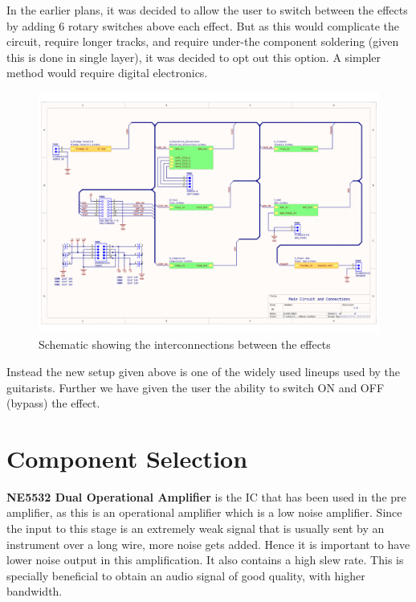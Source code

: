 \documentclass{article}
\begin{document}
                In the earlier plans, it was decided to allow the user to switch between the effects by adding 6 rotary switches above each effect. But as this would complicate the circuit, require longer tracks, and require under-the component soldering (given this is done in single layer), it was decided to opt out this option. A simpler method would require digital electronics.\\

                \begin{figure}
                    \centering
                    \includegraphics[scale=0.4]{conn.png}
                    \caption{Schematic showing the interconnections between the effects}
                    \label{fig:enter-label}
                \end{figure}
                
                Instead the new setup given above is one of the widely used lineups used by the guitarists. Further we have given the user the ability to switch ON and OFF (bypass) the effect.  
                
                
	\section{Component Selection}
            \textbf{NE5532 Dual Operational Amplifier} is the IC that has been used in the pre amplifier, as this is an operational amplifier which is a low noise amplifier. Since the input to this stage is an extremely weak signal that is usually sent by an instrument over a long wire, more noise gets added. Hence it is important to have lower noise output in this amplification. It also contains a high slew rate. This is specially beneficial to obtain an audio signal of good quality, with higher bandwidth.\\
\end{document}
